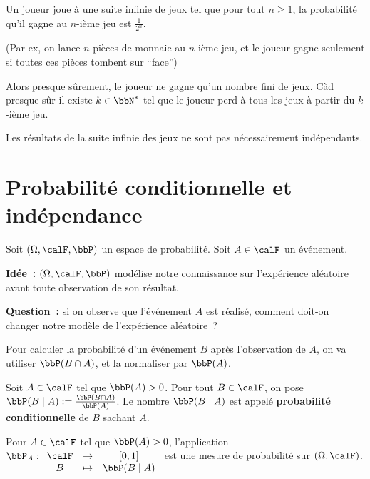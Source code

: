 \begin{exem}[d'application]
    Un joueur joue à une suite infinie de jeux tel que pour tout $n \geqslant 1$,
    la probabilité qu'il gagne au $n$-ième jeu est $\frac{1}{2^n}$.

    (Par ex, on lance $n$ pièces de monnaie au $n$-ième jeu,
    et le joueur gagne seulement si toutes ces pièces tombent sur ``face'')

    Alors presque sûrement, le joueur ne gagne qu'un nombre fini de jeux.
    Càd presque sûr il existe $k \in \bbN^*$ tel que le joueur perd à tous les jeux à partir du $k$-ième jeu.
\end{exem}

\begin{rqq}
    Les résultats de la suite infinie des jeux ne sont pas nécessairement indépendants.
\end{rqq}

\section{Probabilité conditionnelle et indépendance}

Soit $(\Omega, \calF, \bbP)$ un espace de probabilité.
Soit $A \in \calF$ un événement.

\textbf{Idée~:} $(\Omega, \calF, \bbP)$ modélise notre connaissance sur l'expérience aléatoire avant toute observation de son résultat.

\textbf{Question~:} si on observe que l'événement $A$ est réalisé, comment doit-on changer notre modèle de l'expérience aléatoire~?

Pour calculer la probabilité d'un événement $B$ après l'observation de $A$,
on va utiliser $\bbP(B \cap A)$, et la normaliser par $\bbP(A)$.

\begin{deff}
    Soit $A \in \calF$ tel que $\bbP(A) > 0$.
    Pour tout $B \in \calF$, on pose $\bbP(B \mid A) := \frac{\bbP(B \cap A)}{\bbP(A)}$.
    Le nombre $\bbP(B \mid A)$ est appelé \textbf{probabilité conditionnelle} de $B$ sachant $A$.
\end{deff}

\begin{thm}
    Pour $A \in \calF$ tel que $\bbP(A) > 0$, l'application
    $\bbP_A:
        \begin{array}[t]{ccc} \calF & \to & [0, 1] \\ B & \tp & \bbP(B \mid A)
        \end{array}
    $
    est une mesure de probabilité sur $(\Omega, \calF)$.
\end{thm}

